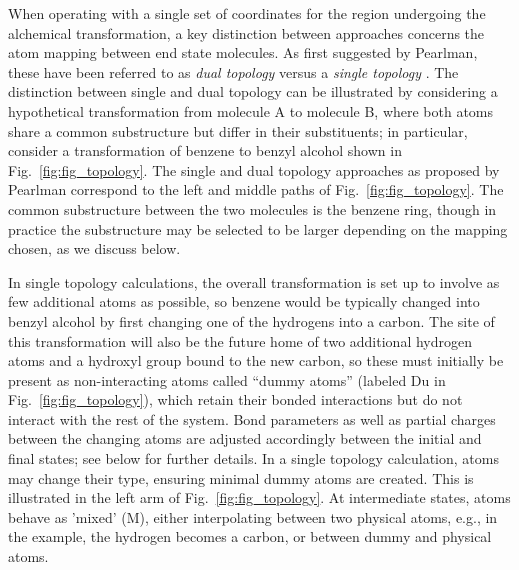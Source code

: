 \documentclass[9pt,bestpractices]{livecoms}
\newcommand{\sbnote}[1]{%
  {\bfseries{}[SB: }%
  {\textcolor{blue}{#1}}{\bfseries{}]}
}
\begin{document}
When operating with a single set of coordinates for the region undergoing the alchemical transformation, a key distinction between approaches concerns the atom mapping between end state molecules. %
As first suggested by Pearlman, these have been referred to as \emph{dual topology} versus a \emph{single topology} \cite{Pearlman_1994}. The distinction between single and dual topology can be illustrated by considering a hypothetical transformation from molecule A to molecule B, where both atoms share a common substructure but differ in their substituents; in particular, consider a transformation of benzene to benzyl alcohol shown in Fig.~\ref{fig:fig_topology}. The single and dual topology approaches as proposed by Pearlman correspond to the left and middle paths of Fig.~\ref{fig:fig_topology}.  %
The common substructure between the two molecules is the benzene ring, though in practice the substructure may be selected to be larger depending on the mapping chosen, as we discuss below.

In single topology calculations, the overall transformation is set up to involve as few additional atoms as possible, so benzene would be typically changed into benzyl alcohol by first changing one of the hydrogens into a carbon. The site of this transformation will also be the future home of two additional hydrogen atoms and a hydroxyl group bound to the new carbon, so these must initially be present as non-interacting atoms called ``dummy atoms'' (labeled Du in Fig.~\ref{fig:fig_topology}), which retain their bonded interactions but do not interact with the rest of the system.  Bond parameters as well as partial charges between the changing atoms are adjusted accordingly between the initial and final states; see below for further details. In a single topology calculation, atoms may change their type, ensuring minimal dummy atoms are created. This is illustrated in the left arm of Fig.~\ref{fig:fig_topology}. At intermediate states, atoms behave as 'mixed' (M), either interpolating between two physical atoms, e.g., in the example, the hydrogen becomes a carbon, or between dummy and physical atoms.
\end{document}
